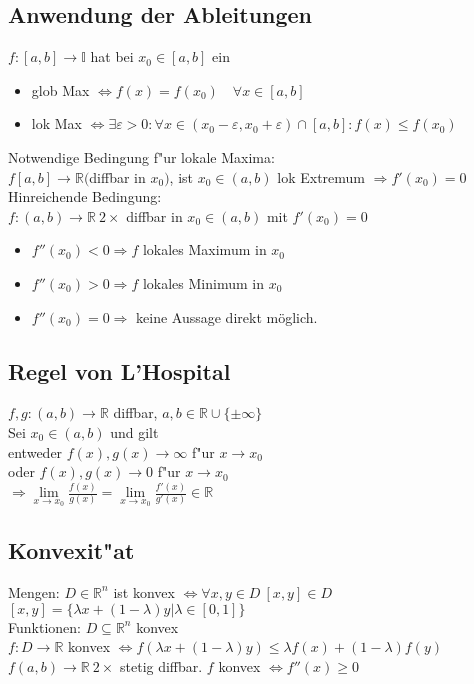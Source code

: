 \documentclass[10pt,a4paper^, twocolumn]{article}
\renewcommand{\epsilon}{\varepsilon} %
\newcommand{\R}{\mathbb{R}}
\newcommand{\I}{\mathbb{I}}
\begin{document}
\subsection{Anwendung der Ableitungen}
	$f:[a,b] \to \I$ hat bei $x_0 \in [a,b]$ ein
	\begin{itemize}
	\item glob Max $\Leftrightarrow f(x) = f(x_0) \quad \forall x \in [a,b]$
	\item lok Max $\Leftrightarrow \exists \epsilon >0: \forall x \in (x_0-\epsilon, x_0+\epsilon) \cap [a,b]: f(x) \leq f(x_0)$
	\end{itemize}
	Notwendige Bedingung f"ur lokale Maxima: \\
	$f[a,b] \to \R ($diffbar in $x_0)$, ist $x_0 \in (a,b)$ lok Extremum $\Rightarrow f'(x_0) = 0$ \\
	Hinreichende Bedingung: \\
	$f: (a,b) \to \R \ 2 \times$ diffbar in $x_0 \in (a,b)$ mit $f'(x_0) = 0$
	\begin{itemize}
	\item $f''(x_0) < 0 \Rightarrow f$ lokales Maximum in $x_0$
	\item $f''(x_0) > 0 \Rightarrow f$ lokales Minimum in $x_0$
	\item $f''(x_0) = 0 \Rightarrow$ keine Aussage direkt möglich.
	\end{itemize}

\subsection{Regel von L'Hospital}
	$f,g: (a,b) \to \R$ diffbar, $a,b \in \R \cup \{\pm \infty\}$ \\
	Sei $x_0 \in (a,b)$ und gilt \\
	entweder $f(x), g(x) \to \infty$ f"ur $x \to x_0$  \\
	oder $f(x),g(x) \to 0$ f"ur $x \to x_0$ \\
	$ \Rightarrow \lim\limits_{x \to x_0} \frac{f(x)}{g(x)} = \lim\limits_{x \to x_0} \frac{f'(x)}{g'(x)} \in \R$

\subsection{Konvexit"at}
	Mengen: $D \in \R^n$ ist konvex $\Leftrightarrow \forall x,y \in D \ [x,y] \in D$ \\ 
	$[ x, y ] = \{\lambda x + (1- \lambda)y | \lambda \in [0,1] \}$ \\
	Funktionen: $D \subseteq \R^n$ konvex \\
	$f: D \to \R$ konvex 	$\Leftrightarrow f(\lambda x + (1-\lambda)y) \leq \lambda f(x) + (1 - \lambda ) f(y)$\\
	$f(a,b) \to \R \ 2 \times$ stetig diffbar.  $f$ konvex $\Leftrightarrow f''(x) \geq 0$
\end{document}
